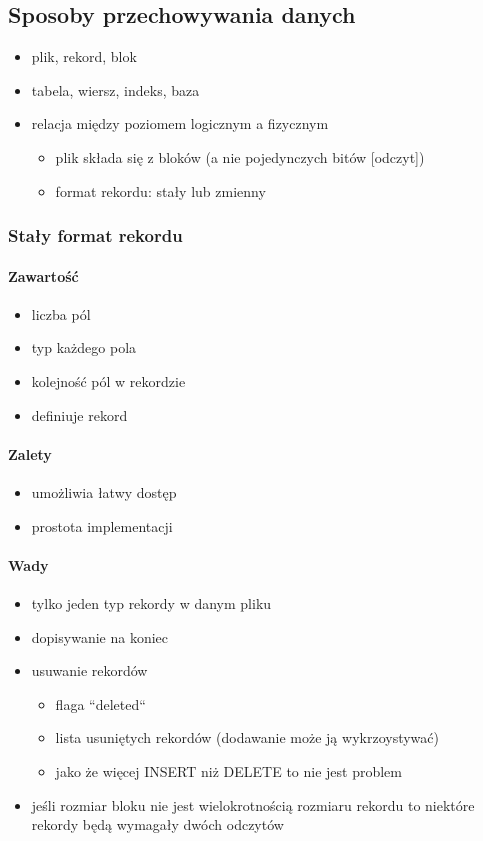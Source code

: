 \documentclass[12pt]{article}
\begin{document}
\subsection{Sposoby przechowywania danych}
\begin{itemize}
\item plik, rekord, blok
\item tabela, wiersz, indeks, baza
\item relacja między poziomem logicznym a fizycznym
\begin{itemize}
\item plik składa się z bloków (a nie pojedynczych bitów [odczyt])
\item format rekordu: stały lub zmienny
\end{itemize}
\end{itemize}

\subsubsection{Stały format rekordu}
\paragraph{Zawartość}
\begin{itemize}
\item liczba pól
\item typ każdego pola
\item kolejność pól w rekordzie
\item definiuje rekord
\end{itemize}

\paragraph{Zalety}
\begin{itemize}
\item umożliwia łatwy dostęp
\item prostota implementacji
\end{itemize}


\paragraph{Wady}
\begin{itemize}
\item tylko jeden typ rekordy w danym pliku
\item dopisywanie na koniec
\item usuwanie rekordów
\begin{itemize}
\item flaga ``deleted``
\item lista usuniętych rekordów (dodawanie może ją wykrzoystywać)
\item jako że więcej INSERT niż DELETE to nie jest problem
\end{itemize}
\item jeśli rozmiar bloku nie jest wielokrotnością rozmiaru rekordu to niektóre
    rekordy będą wymagały dwóch odczytów
\end{itemize}
\end{document}

